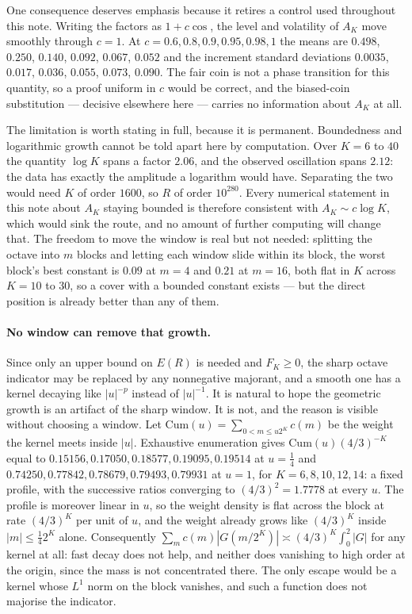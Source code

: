 \documentclass[11pt]{article}
\theoremstyle{remark}
\begin{document}
One consequence deserves emphasis because it retires a control used throughout this note. Writing the
factors as $1+c\cos$, the level and volatility of $A_K$ move smoothly through $c=1$. At
$c=0.6,0.8,0.9,0.95,0.98,1$ the means are $0.498$, $0.250$, $0.140$, $0.092$, $0.067$, $0.052$ and the
increment standard deviations $0.0035$, $0.017$, $0.036$, $0.055$, $0.073$, $0.090$. The fair coin is not a phase
transition for this quantity, so a proof uniform in $c$ would be correct, and the biased-coin
substitution --- decisive elsewhere here --- carries no information about $A_K$ at all.

The limitation is worth stating in full, because it is permanent. Boundedness and logarithmic growth
cannot be told apart here by computation. Over $K=6$ to $40$ the quantity $\log K$ spans a factor
$2.06$, and the observed oscillation spans $2.12$: the data has exactly the amplitude a logarithm would
have. Separating the two would need $K$ of order $1600$, so $R$ of order $10^{280}$. Every numerical
statement in this note about $A_K$ staying bounded is therefore consistent with $A_K\sim c\log K$, which
would sink the route, and no amount of further computing will change that. The freedom to move the window is real but not
needed: splitting the octave into $m$ blocks and letting each window slide within its block, the worst
block's best constant is $0.09$ at $m=4$ and $0.21$ at $m=16$, both flat in $K$ across $K=10$ to $30$,
so a cover with a bounded constant exists --- but the direct position is already better than any of them.

\paragraph{No window can remove that growth.} Since only an upper bound on $E(R)$ is needed and
$F_K\ge0$, the sharp octave indicator may be replaced by any nonnegative majorant, and a smooth one has
a kernel decaying like $|u|^{-p}$ instead of $|u|^{-1}$. It is natural to hope the geometric growth is
an artifact of the sharp window. It is not, and the reason is visible without choosing a window. Let
$\mathrm{Cum}(u)=\sum_{0<m\le u2^K}c(m)$ be the weight the kernel meets inside $|u|$. Exhaustive
enumeration gives $\mathrm{Cum}(u)(4/3)^{-K}$ equal to
$0.15156,0.17050,0.18577,0.19095,0.19514$ at $u=\tfrac14$ and
$0.74250,0.77842,0.78679,0.79493,0.79931$ at $u=1$, for $K=6,8,10,12,14$: a fixed profile, with the
successive ratios converging to $(4/3)^2=1.7778$ at every $u$. The profile is moreover linear in $u$,
so the weight density is flat across the block at rate $(4/3)^K$ per unit of $u$, and the weight already
grows like $(4/3)^K$ inside $|m|\le\tfrac142^K$ alone. Consequently $\sum_mc(m)|G(m/2^K)|\asymp
(4/3)^K\int_0^2|G|$ for any kernel at all: fast decay does not help, and neither does vanishing to high
order at the origin, since the mass is not concentrated there. The only escape would be a kernel whose
$L^1$ norm on the block vanishes, and such a function does not majorise the indicator.
\end{document}
